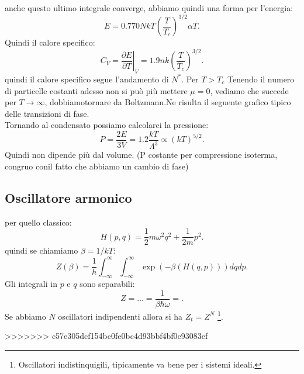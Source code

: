 anche questo ultimo integrale converge, abbiamo quindi una forma per l'energia:
\[
	E = 0.770 NkT \left( \frac{T}{T_{c}} \right) ^{3 /2} \alpha T
.\] 
Quindi il calore specifico:
\[
	C_{V}= \left.\frac{\partial E}{\partial T} \right|_{V} = 1.9 nk \left( \frac{T}{T_{c}} \right) ^{3 /2}
.\] 
quindi il calore specifico segue l'andamento di $N^{*}$. 
Per $T > T_{c}$ Tenendo il numero di particelle costanti adesso non si può più mettere $\mu = 0$, vediamo che succede per $T\to \infty$, dobbiamotornare da Boltzmann.Ne risulta il seguente grafico tipico delle transizioni di fase.\\
Tornando al condensato possiamo calcolarci la pressione: 
 \[
	 P = \frac{2E}{3V} = 1.2 \frac{kT}{\Lambda ^3} \propto \left( kT \right) ^{5 /2} 
.\] 
Quindi non dipende più dal volume. (P costante per compressione isoterma, congruo conil fatto che abbiamo un cambio di fase)
\subsection{Oscillatore armonico}%
per quello classico:
\[
	H( p,q) = \frac{1}{2}m\omega ^2q^2 + \frac{1}{2m}p^2
.\] 
quindi se chiamiamo $\beta  = 1 /kT$:
\[
	Z( \beta )  = \frac{1}{h}\int_{-\infty}^{\infty} \int_{-\infty}^{\infty} \exp\left( -\beta \left( H( q,p)  \right)  \right) dqdp  
.\] 
Gli integrali in $p$ e $q$ sono separabili:
\[
	Z = \ldots = \frac{1}{\beta \hbar\omega } = 
.\] 
Se abbiamo $N$ oscillatori indipendenti allora si ha $Z_{t} = Z^{N}$ \footnote{Oscillatori indistinquigili, tipicamente va bene per i sistemi ideali.}.
\label{sub:oscillatore_armonico}


>>>>>>> c57e305dcf154bc0fe0bc4d93bbf4bf0c93083ef
